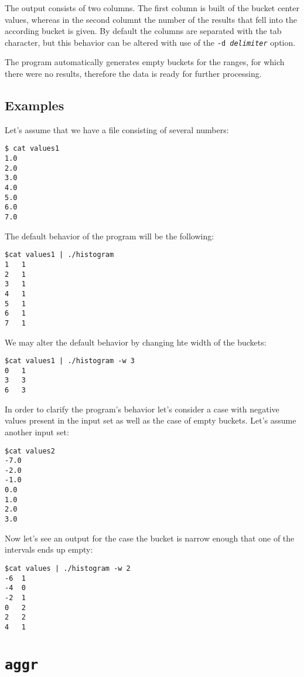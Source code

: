 \documentclass{report}
\begin{document}
The output consists of two columns. The first column is built of the bucket
center values, whereas in the second columnt the number of the results that
fell into the according bucket is given. By default the columns are separated
with the tab character, but this behavior can be altered with use of the
\texttt{-d \textit{delimiter}} option.

The program automatically generates empty buckets for the ranges, for which
there were no results, therefore the data is ready for further processing.

\subsection{Examples}
Let's assume that we have a file consisting of several numbers:
\begin{verbatim}
$ cat values1
1.0
2.0
3.0
4.0
5.0
6.0
7.0
\end{verbatim}

The default behavior of the program will be the following:
\begin{verbatim}
$cat values1 | ./histogram
1	1
2	1
3	1
4	1
5	1
6	1
7	1
\end{verbatim}

We may alter the default behavior by changing hte width of the buckets:
\begin{verbatim}
$cat values1 | ./histogram -w 3
0	1
3	3
6	3
\end{verbatim}

In order to clarify the program's behavior let's consider a case with negative values
present in the input set as well as the case of empty buckets. Let's assume another
input set:
\begin{verbatim}
$cat values2
-7.0
-2.0
-1.0
0.0
1.0
2.0
3.0
\end{verbatim}

Now let's see an output for the case the bucket is narrow enough that one of the
intervals ends up empty:
\begin{verbatim}
$cat values | ./histogram -w 2
-6	1
-4	0
-2	1
0	2
2	2
4	1
\end{verbatim}

\section{\texttt{aggr}}
\end{document}
